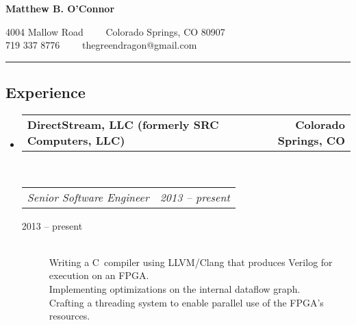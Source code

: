 \documentclass[10pt,letterpaper]{article}
\makeatletter
\newcommand{\headerrow}[2]
{\begin{tabular*}{\linewidth}{l@{\extracolsep{\fill}}r}
	#1 &
	#2 \\
\end{tabular*}}
\newcommand{\CPP}
{C\nolinebreak[4]\hspace{-.05em}\raisebox{.22ex}{\footnotesize\bf ++}}
\makeatother
\begin{document}
\begin{center}
{\LARGE \textbf{Matthew B. O'Connor}}

4004 Mallow Road\ \ \textbullet
\ \ Colorado Springs, CO 80907
\\
719 337 8776\ \ \textbullet
\ \ thegreendragon@gmail.com
\end{center}

\hrule
\vspace{-0.4em}
\subsection*{Experience}

\begin{itemize}
	\parskip=0.1em

	\item
	\headerrow
		{\textbf{DirectStream, LLC (formerly SRC Computers, LLC)}}
		{\textbf{Colorado Springs, CO}}
	\\
	\headerrow
		{\emph{Senior Software Engineer}}
		{\emph{2013 -- present}}
	\begin{description}
		\item[2013 -- present] \hfill \\
				Writing a \CPP \  compiler using LLVM/Clang that produces Verilog for execution on an FPGA. \\
				Implementing optimizations on the internal dataflow graph. \\
				Crafting a threading system to enable parallel use of the FPGA’s resources. \\
	\end{description}


\end{itemize}
\end{document}
